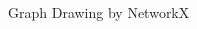 \documentclass[dvipdfmx,13pt,aspectratio=169]{beamer}
\begin{document}
\begin{frame}{Graph Drawing by NetworkX}
\begin{columns}
\begin{column}{0.38\columnwidth}
\begin{figure}[htbp]

\end{figure}
\end{column}
\end{columns}
\end{frame}
\end{document}
